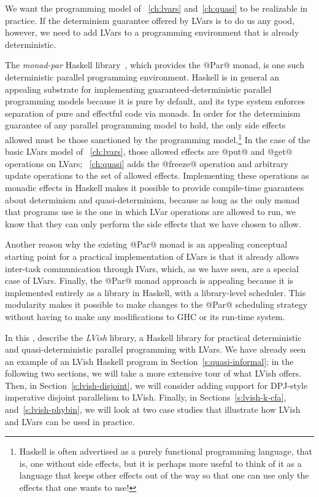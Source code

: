 We want the programming model of ~\ref{ch:lvars}
and~\ref{ch:quasi} to be realizable in practice.  If the determinism
guarantee offered by LVars is to do us any good, however, we need to
add LVars to a programming environment that is already deterministic.

The \emph{monad-par} Haskell library~\cite{monad-par}, which provides
the @Par@ monad, is one such deterministic parallel programming
environment.  Haskell is in general an appealing substrate for
implementing guaranteed-deterministic parallel programming models
because it is pure by default, and its type system enforces separation
of pure and effectful code via monads.  In order for the determinism
guarantee of any parallel programming model to hold, the only side
effects allowed must be those sanctioned by the programming
model.\footnote{Haskell is often advertised as a purely functional
programming language, that is, one without side effects, but it is
perhaps more useful to think of it as a language that keeps other
effects out of the way so that one can use only the effects that one
wants to use!}  In the case of the basic LVars model
of ~\ref{ch:lvars}, those allowed effects are
@put@ and @get@ operations on
LVars; ~\ref{ch:quasi} adds the @freeze@
operation and arbitrary update operations to the set of allowed
effects.  Implementing these operations as monadic effects in Haskell
makes it possible to provide compile-time guarantees about determinism
and quasi-determinism, because as long as the only monad that programs
use is the one in which LVar operations are allowed to run, we know
that they can only perform the side effects that we have chosen to
allow.

Another reason why the existing @Par@ monad is an appealing conceptual
starting point for a practical implementation of LVars is that it
already allows inter-task communication through IVars, which, as we
have seen, are a special case of LVars.  Finally, the @Par@ monad
approach is appealing because it is implemented entirely as a library
in Haskell, with a library-level scheduler.  This modularity makes it
possible to make changes to the @Par@ scheduling strategy without
having to make any modifications to GHC or its run-time system.

In this ,  describe
the \emph{LVish} library, a Haskell library for practical
deterministic and quasi-deterministic parallel programming with LVars.
We have already seen an example of an LVish Haskell program in
Section~\ref{s:quasi-informal}; in the following two sections, we will
take a more extensive tour of what LVish offers.  Then, in
Section~\ref{s:lvish-disjoint}, we will consider adding support for
DPJ-style imperative disjoint parallelism to LVish.  Finally, in
Sections~\ref{s:lvish-k-cfa}, and~\ref{s:lvish-phybin}, we will look
at two case studies that illustrate how LVish and LVars can be used in
practice.
